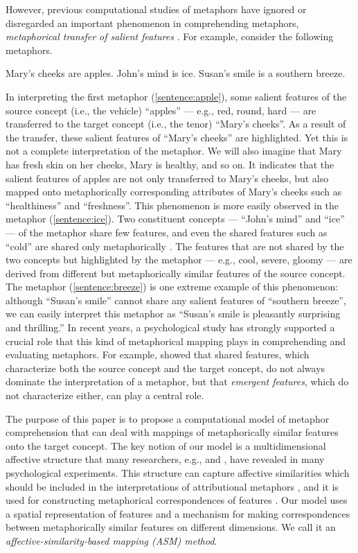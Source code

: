 However, previous computational studies of metaphors have ignored or disregarded an
important phenomenon in comprehending metaphors, 
{\it metaphorical transfer of salient features} \cite{Tourangeau82,Tourangeau91,Becker97}.
For example, consider the following metaphors.
\begin{slist}
  \sitem Mary's cheeks are apples. \label{sentence:apple}
  \sitem John's mind is ice. \label{sentence:ice}
  \sitem Susan's smile is a southern breeze. \label{sentence:breeze}
\end{slist}
In interpreting the first metaphor (\ref{sentence:apple}), some salient features of
the source concept (i.e., the vehicle) ``apples'' --- e.g., red, round, hard --- 
are transferred to the target concept (i.e., the tenor) ``Mary's cheeks''.
As a result of the transfer, these salient features of ``Mary's cheeks''
are highlighted. Yet this is not a complete interpretation of the metaphor.  
We will also imagine that Mary has fresh skin on her cheeks, Mary is healthy, and so on.
It indicates that the salient features of apples are not
only transferred to Mary's cheeks, but also mapped onto metaphorically
corresponding attributes of Mary's cheeks such as 
``healthiness'' and ``freshness''.
This phenomenon is more easily observed in the metaphor (\ref{sentence:ice}).
Two constituent concepts --- ``John's mind'' and ``ice'' --- 
of the metaphor share few features, and even the shared features 
such as ``cold'' are shared only metaphorically \cite{Tourangeau82}. 
The features that are not shared by the two concepts but highlighted by the metaphor 
--- e.g., cool, severe, gloomy --- 
are derived from different but metaphorically similar features of the source concept.
The metaphor (\ref{sentence:breeze}) is one extreme example of this phenomenon:
although ``Susan's smile'' cannot share any salient features of ``southern breeze'',
we can easily interpret this metaphor as ``Susan's smile is pleasantly surprising
and thrilling.''
In recent years, a psychological study has strongly supported a crucial
role that this kind of metaphorical mapping plays in comprehending and
evaluating metaphors. For example, 
 showed that shared features, which
characterize both the source concept and the target concept, do not always
dominate the interpretation of a metaphor, but that {\it emergent
features}, which do not characterize either, can play a central role.

The purpose of this paper is to propose a computational model of
metaphor comprehension that can deal with mappings of metaphorically
similar features onto the target concept.  The key notion of our model
is a multidimensional affective structure that many researchers,
e.g.,  and , have revealed in many
psychological experiments.  
This structure can capture
affective similarities which should be included in the interpretations
of attributional metaphors \cite{Kusumi87}, 
and it is used for constructing metaphorical correspondences of features 
\cite{Tourangeau82,Weiner85}.
Our model uses a spatial representation of features and a mechanism
for making correspondences between metaphorically similar features on
different dimensions.
We call it an {\it affective-similarity-based mapping (ASM) method}.

